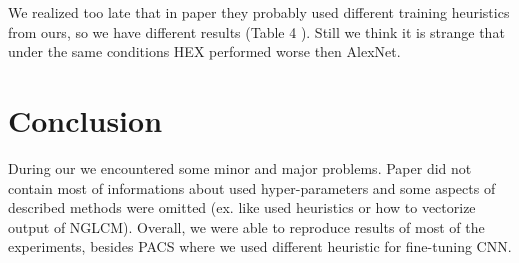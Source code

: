 \documentclass{article} %
\begin{document}
We realized too late that in paper they probably used different training heuristics from ours, so we have different results (Table 4 \citep{wang2018learning}).
Still we think it is strange that under the same conditions HEX performed worse then AlexNet.

\section{Conclusion}

During our  we encountered some minor and major problems.
Paper did not contain most of informations about used hyper-parameters and some aspects of described
methods were omitted (ex. like used heuristics or how to vectorize output of NGLCM). Overall, we were
able to reproduce results of most of the experiments, besides PACS where we used different heuristic
for fine-tuning CNN.



\end{document}

